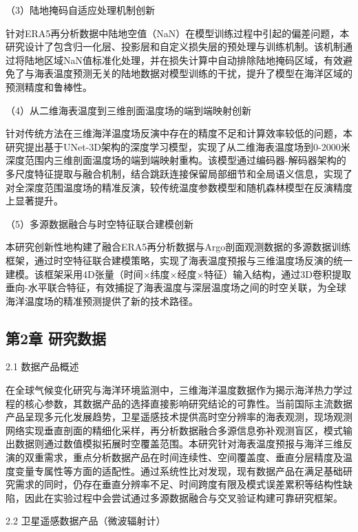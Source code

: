 \documentclass[
  12pt,
]{article}
\begin{document}
（3）陆地掩码自适应处理机制创新

针对ERA5再分析数据中陆地空值（NaN）在模型训练过程中引起的偏差问题，本研究设计了包含归一化层、投影层和自定义损失层的预处理与训练机制。该机制通过将陆地区域NaN值标准化处理，并在损失计算中自动排除陆地掩码区域，有效避免了与海表温度预测无关的陆地数据对模型训练的干扰，提升了模型在海洋区域的预测精度和鲁棒性。

（4）从二维海表温度到三维剖面温度场的端到端映射创新

针对传统方法在三维海洋温度场反演中存在的精度不足和计算效率较低的问题，本研究提出基于UNet-3D架构的深度学习模型，实现了从二维海表温度场到0-2000米深度范围内三维剖面温度场的端到端映射重构。该模型通过编码器-解码器架构的多尺度特征提取与融合机制，结合跳跃连接保留局部细节和全局语义信息，实现了对全深度范围温度场的精准反演，较传统温度参数模型和随机森林模型在反演精度上显著提升。

（5）多源数据融合与时空特征联合建模创新

本研究创新性地构建了融合ERA5再分析数据与Argo剖面观测数据的多源数据训练框架，通过时空特征联合建模策略，实现了海表温度预报与三维温度场反演的统一建模。该框架采用4D张量（时间×纬度×经度×特征）输入结构，通过3D卷积提取垂向-水平联合特征，有效捕捉了海表温度与深层温度场之间的时空关联，为全球海洋温度场的精准预测提供了新的技术路径。

\subsection{第2章
研究数据}\label{ux7b2c2ux7ae0-ux7814ux7a76ux6570ux636e}

\protect{}\label{_Toc1882328034}{}2.1 数据产品概述

在全球气候变化研究与海洋环境监测中，三维海洋温度数据作为揭示海洋热力学过程的核心参数，其数据产品的选择直接影响研究结论的可靠性。当前国际主流数据产品呈现多元化发展趋势，卫星遥感技术提供高时空分辨率的海表观测，现场观测网络实现垂直剖面的精细化采样，再分析数据融合多源信息弥补观测盲区，模式输出数据则通过数值模拟拓展时空覆盖范围。本研究针对海表温度预报与海洋三维反演的双重需求，重点分析数据产品在时间连续性、空间覆盖度、垂直分层精度及温度变量专属性等方面的适配性。通过系统性比对发现，现有数据产品在满足基础研究需求的同时，仍存在垂直分辨率不足、时间跨度有限及模式误差累积等结构性缺陷，因此在实验过程中会尝试通过多源数据融合与交叉验证构建可靠研究框架。

\protect{}\label{_Toc1705663481}{}2.2
卫星遥感数据产品（微波辐射计）
\end{document}
